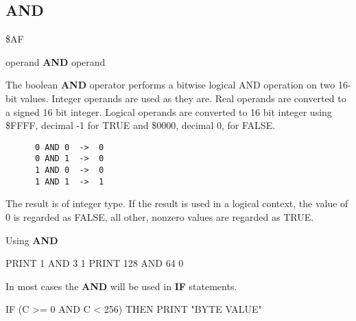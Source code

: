 \subsection{AND}
\begin{description}[leftmargin=3cm,style=nextline]
\item [Token:] \$AF
\item [Format:] operand {\bf AND} operand
\item [Usage:]  The boolean {\bf AND} operator performs a bitwise
                logical AND operation on two 16-bit values.
                Integer operands are used as they are.
                Real operands are converted to a signed 16 bit integer.
                Logical operands are converted to 16 bit integer
                using \$FFFF, decimal -1 for TRUE
                and \$0000, decimal 0, for FALSE.

   \begin{verbatim}
      0 AND 0  ->  0
      0 AND 1  ->  0
      1 AND 0  ->  0
      1 AND 1  ->  1
   \end{verbatim}

\item [Remarks:] The result is of integer type.
                 If the result is used in a logical context,
                 the value of 0 is regarded as FALSE,
                 all other, nonzero values are regarded as TRUE.
\item [Example:] Using {\bf AND}

\begin{screenoutput}
  PRINT 1 AND 3
  1
  PRINT 128 AND 64
  0
\end{screenoutput}

In most cases the {\bf AND} will be used in {\bf IF} statements.

\begin{screenoutput}
   IF (C >= 0 AND C < 256) THEN PRINT "BYTE VALUE"
\end{screenoutput}
\end{description}


\newpage
